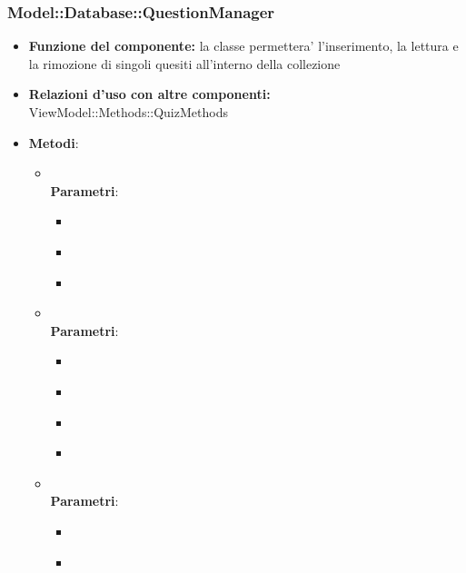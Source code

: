 \begin{itemize}
\subsubsection{Model::Database::QuestionManager}
\begin{itemize}
\item\textbf{Funzione del componente:} la classe permettera' l'inserimento, la lettura e la rimozione di singoli quesiti all'interno della collezione
\item\textbf{Relazioni d'uso con altre componenti:} ViewModel::Methods::QuizMethods\\
\item\textbf{Metodi}:
	\begin{itemize}
		\item{}\\
		\textbf{Parametri}:
			\begin{itemize}
				\item{}\\
				\item{}\\
				\item{}\\
			\end{itemize}
		\item{}\\
		\textbf{Parametri}:
			\begin{itemize}
				\item{}\\
				\item{}\\
				\item{}\\
				\item{}\\
			\end{itemize}
		\item{}\\
		\textbf{Parametri}:
			\begin{itemize}
				\item{}\\
				\item{}\\
			\end{itemize}
	\end{itemize}
\end{itemize}


\end{itemize}
